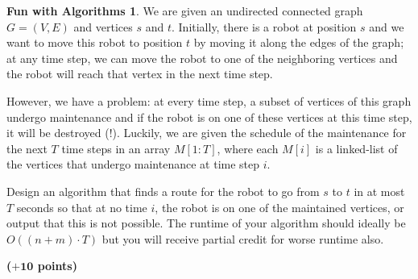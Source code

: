 \documentclass{article}
\theoremstyle{definition}
\newtheorem*{fun}{Fun with Algorithms}
\newcommand{\grade}[1]{\hfill{\textbf{($\mathbf{#1}$ points)}}}
\begin{document}
\smallskip

\begin{fun}
	 We are given an undirected connected graph $G=(V,E)$ and  vertices $s$ and $t$. Initially, there is a robot at position  $s$ and we want to move this robot to position $t$ by moving it along the edges of the graph; at any time step, 
	 we can move the robot to one of the  neighboring vertices and the robot will reach that vertex in the next time step. 
	 
	 However, we have a problem: at every time step, a subset of vertices of this graph undergo  maintenance and if the robot is on one of these vertices at this time step, 
	 it will be destroyed (!). Luckily, we are given the schedule of the maintenance for the next $T$ time steps in an array $M[1:T]$, where each $M[i]$ is a linked-list of the vertices that undergo maintenance at time step $i$.  
	 
	 Design an
	 algorithm that finds a route for the robot to go from $s$ to $t$ in at most $T$ seconds so that at no time $i$, the robot is on one of the maintained vertices, or output that this is not possible. The runtime of your algorithm should ideally be $O((n+m) \cdot T)$ 
	 but you will receive partial credit for worse runtime also.  
	 
	 \grade{+10}
	 
	 \end{fun}
\end{document}
